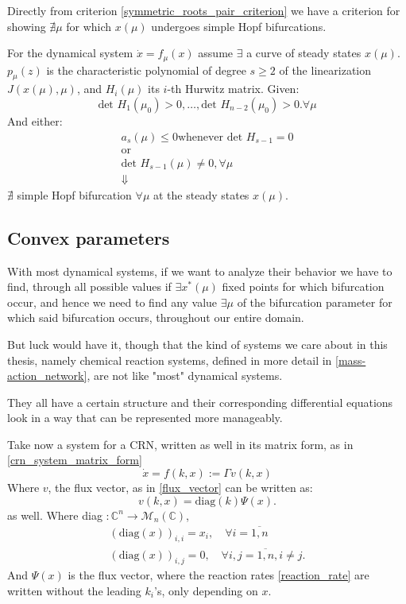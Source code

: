 Directly from criterion \ref{symmetric_roots_pair_criterion} we have a criterion for showing $\nexists \mu$ for which $x(\mu)$ undergoes simple Hopf bifurcations.
\begin{theorem}\label{ruling_out_simple_hopf_bif}

	For the dynamical system $\dot{x} = f_\mu(x)$ assume $\exists$ a curve of steady states $x(\mu)$.
	$p_\mu(z)$ is the characteristic polynomial of degree $s \geq 2$ of the linearization $J(x(\mu), \mu)$, and $H_i(\mu)$ its $i$-th Hurwitz matrix. Given:
	\[
		\text{det }H_1(\mu_0) > 0 , \dots, \text{det }H_{n-2} (\mu_0) > 0. \forall \mu
	\]
	And either:
	\begin{gather*}
		a_s(\mu) \leq 0 \text{whenever  det } H_{s-1} = 0  \\
		\text{or} \\
		\text{det }  H_{s-1}(\mu) \neq 0, \forall \mu    \\
		\Downarrow
	\end{gather*}
	$\nexists$ simple Hopf bifurcation $\forall \mu$ at the steady states $x(\mu)$.
\end{theorem}

\subsection{Convex parameters}\label{convex_paramteres}
With most dynamical systems, if we want to analyze their behavior we have to find, through all possible values if $\exists x^*(\mu)$ fixed points for which bifurcation occur, and hence we need to find any value $\exists \mu$ of the bifurcation parameter for which said bifurcation occurs, throughout our entire domain.

But luck would have it, though that the kind of systems we care about in this thesis, namely chemical reaction systems, defined in more detail in \ref{mass-action_network}, are not like "most" dynamical systems.

They all have a certain structure and their corresponding differential equations look in a way that can be represented more manageably.

Take now a system for a CRN, written as well in its matrix form, as in \ref{crn_system_matrix_form}
\[
	\dot{x} = f(k,x) :=\Gamma v(k,x)
\]
Where $v$, the flux vector, as in \ref{flux_vector} can be written as:
\[
	v(k, x) = \text{diag}(k)\Psi(x).
\]
as well.
Where diag $: \mathbb{C}^n \rightarrow \mathcal{M}_n(\mathbb{C})$,
\begin{align*}
	(\text{diag}(x))_{i,i} = x_i, \quad \forall i = \overline{1,n} \\
	(\text{diag}(x))_{i,j} = 0, \quad \forall i,j = \overline{1,n} , i \neq j.
\end{align*}
And $\Psi(x)$ is the flux vector, where the reaction rates \ref{reaction_rate} are written without the leading $k_i$'s, only depending on $x$.

